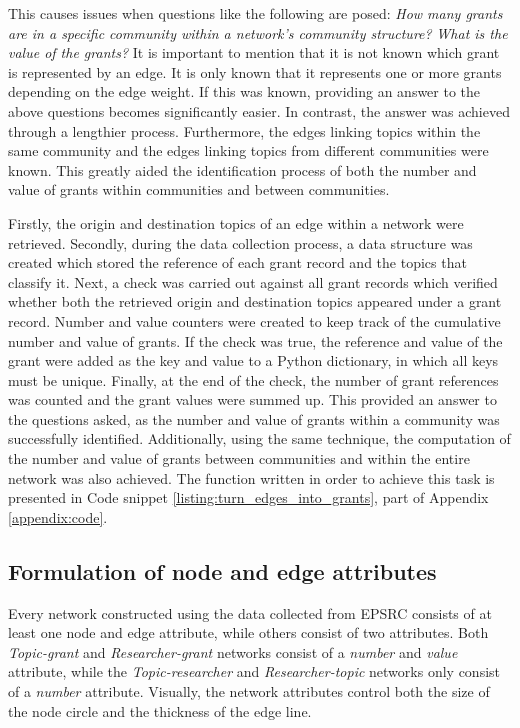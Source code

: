 This causes issues when questions like the following are posed: \textit{How many grants are in a specific community within a network's community structure?} \textit{What is the value of the grants?} It is important to mention that it is not known which grant is represented by an edge. It is only known that it represents one or more grants depending on the edge weight. If this was known, providing an answer to the above questions becomes significantly easier. In contrast, the answer was achieved through a lengthier process. Furthermore, the edges linking topics within the same community and the edges linking topics from different communities were known. This greatly aided the identification process of both the number and value of grants within communities and between communities.

Firstly, the origin and destination topics of an edge within a network were retrieved. Secondly, during the data collection process, a data structure was created which stored the reference of each grant record and the topics that classify it. Next, a check was carried out against all grant records which verified whether both the retrieved origin and destination topics appeared under a grant record. Number and value counters were created to keep track of the cumulative number and value of grants. If the check was true, the reference and value of the grant were added as the key and value to a Python dictionary, in which all keys must be unique. Finally, at the end of the check, the number of grant references was counted and the grant values were summed up. This provided an answer to the questions asked, as the number and value of grants within a community was successfully identified. Additionally, using the same technique, the computation of the number and value of grants between communities and within the entire network was also achieved. The function written in order to achieve this task is presented in Code snippet \ref{listing:turn_edges_into_grants}, part of Appendix \ref{appendix:code}.

\subsection{Formulation of node and edge attributes}

Every network constructed using the data collected from EPSRC consists of at least one node and edge attribute, while others consist of two attributes. Both \textit{Topic-grant} and \textit{Researcher-grant} networks consist of a \textit{number} and \textit{value} attribute, while the \textit{Topic-researcher} and \textit{Researcher-topic} networks only consist of a \textit{number} attribute. Visually, the network attributes control both the size of the node circle and the thickness of the edge line.

